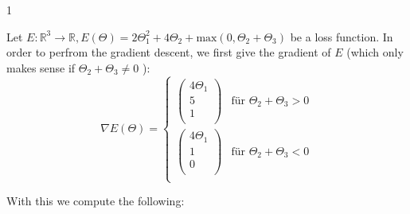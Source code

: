 \documentclass{article}
\begin{document}
\begin{ukon-infie}[12.11.17]{1}
		\begin{exercise}[p=10]{}
        	
		\end{exercise}
		
		\begin{exercise}[p=10]{}
        	Let $E: \mathbb{R}^3 \rightarrow \mathbb{R}, E(\Theta) = 2\Theta_1^2 + 4\Theta_2 + \text{max}(0, \Theta_2 + \Theta_3)$ be a loss function. In order to perfrom the gradient descent, we first give the gradient of $E$ (which only makes sense if $\Theta_2 + \Theta_3 \not = 0$ ): 
\begin{equation}
\nabla E(\Theta) =
\begin{cases}
\left(
\begin{array}{c}
4 \Theta_1\\
5\\
1\\
\end{array}
\right) & \text{für } \Theta_2 + \Theta_3 > 0 \\
 \left(
\begin{array}{c}
4\Theta_1\\
1\\
0\\
\end{array}
\right) & \text{für } \Theta_2 + \Theta_3 < 0\\
\end{cases}
\end{equation}

With this we compute the following:\\


\end{exercise}
\end{ukon-infie}
\end{document}
